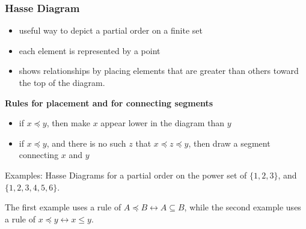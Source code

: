 \subsubsection*{Hasse Diagram}
\begin{itemize}
  \item useful way to depict a partial order on a finite set
  \item each element is represented by a point
  \item shows relationships by placing elements that are greater than others toward the top of the diagram.
\end{itemize}
\textbf{Rules for placement and for connecting segments}
\begin{itemize}
  \item if $x \preceq y$, then make $x$ appear lower in the diagram than $y$
  \item if $x \preceq y$, and there is no such $z$ that $x \preceq z \preceq y$, then draw a segment connecting $x$ and $y$
\end{itemize}
Examples: Hasse Diagrams for a partial order on the power set of $\{1,2,3\}$, and $\{1,2,3,4,5,6\}$.
\begin{center}
  \qquad
\end{center}
The first example uses a rule of $A \preceq B \leftrightarrow A \subseteq B$,
while the second example uses a rule of $x \preceq y \leftrightarrow x \leq y$.

